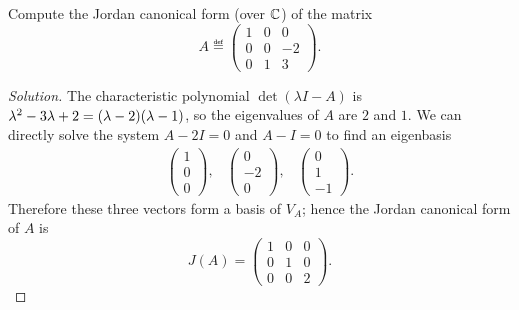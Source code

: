 \documentclass{./typewriter-math}
\begin{document}
	\begin{exercise}[(DF 12.3.5)]
		Compute the Jordan canonical form (over \(\mathbb{C}\)) of the matrix%
		\[%
			A \eqdef \begin{pmatrix}
				1 & 0 & 0\\
				0 & 0 & -2\\
				0 & 1 & 3
			\end{pmatrix}.
		\]%
		\begin{proof}[Solution]
			The characteristic polynomial \(\det (\lambda I - A)\) is \(\lambda^2 - 3
			\lambda + 2 = {\left(\lambda - 2\right)}{\left(\lambda - 1\right)}\), so the eigenvalues
			of \(A\) are \(2\) and \(1\). We can directly solve the system \(A - 2 I =
			0\) and \(A - I = 0\) to find an eigenbasis%
			\[%
				\begin{array}{ccc}
					\begin{pmatrix} 1\\0\\0 \end{pmatrix},&
					\begin{pmatrix} 0\\-2\\0 \end{pmatrix},&
					\begin{pmatrix} 0\\1\\-1 \end{pmatrix}.
				\end{array}
			\]%
			Therefore these three vectors form a basis of \(V_A\); hence the Jordan
			canonical form of \(A\) is%
			\[%
				J(A) = \begin{pmatrix}
					1 & 0 & 0\\
					0 & 1 & 0\\
					0 & 0 & 2
				\end{pmatrix}.
			\]%
		\end{proof}
	\end{exercise}
\end{document}
